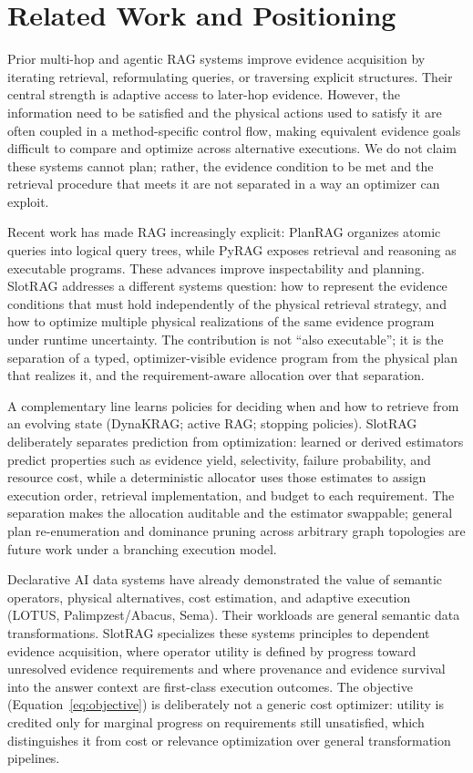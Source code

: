 \section{Related Work and Positioning}
\label{sec:related}

Prior multi-hop and agentic RAG systems improve evidence acquisition by
iterating retrieval, reformulating queries, or traversing explicit structures.
Their central strength is adaptive access to later-hop evidence. However, the
information need to be satisfied and the physical actions used to satisfy it
are often coupled in a method-specific control flow, making equivalent evidence
goals difficult to compare and optimize across alternative executions. We do
not claim these systems cannot plan; rather, the evidence condition to be met
and the retrieval procedure that meets it are not separated in a way an
optimizer can exploit.

Recent work has made RAG increasingly explicit: PlanRAG organizes atomic queries
into logical query trees, while PyRAG exposes retrieval and reasoning as
executable programs. These advances improve inspectability and planning.
SlotRAG addresses a different systems question: how to represent the evidence
conditions that must hold independently of the physical retrieval strategy, and
how to optimize multiple physical realizations of the same evidence program
under runtime uncertainty. The contribution is not ``also executable''; it is
the separation of a typed, optimizer-visible evidence program from the physical
plan that realizes it, and the requirement-aware allocation over that
separation.

A complementary line learns policies for deciding when and how to retrieve from
an evolving state (DynaKRAG; active RAG; stopping policies). SlotRAG
deliberately separates prediction from optimization: learned or derived
estimators predict properties such as evidence yield, selectivity, failure
probability, and resource cost, while a deterministic allocator uses those
estimates to assign execution order, retrieval implementation, and budget to
each requirement. The separation makes the allocation auditable and the
estimator swappable; general plan re-enumeration and dominance pruning across
arbitrary graph topologies are future work under a branching execution
model.

Declarative AI data systems have already demonstrated the value of semantic
operators, physical alternatives, cost estimation, and adaptive execution
(LOTUS, Palimpzest/Abacus, Sema). Their workloads are general semantic data
transformations. SlotRAG specializes these systems principles to dependent
evidence acquisition, where operator utility is defined by progress toward
unresolved evidence requirements and where provenance and evidence survival
into the answer context are first-class execution outcomes. The objective
(Equation~\ref{eq:objective}) is deliberately not a generic cost optimizer:
utility is credited only for marginal progress on requirements still
unsatisfied, which distinguishes it from cost or relevance optimization over
general transformation pipelines.


